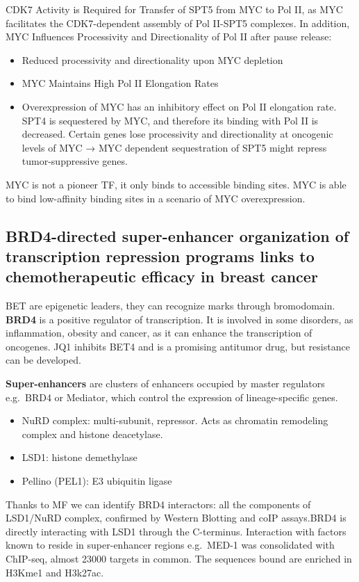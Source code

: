 CDK7 Activity is Required for Transfer of SPT5 from MYC to Pol II, as MYC facilitates the CDK7-dependent assembly of Pol II-SPT5 complexes. In addition, MYC Influences Processivity and Directionality of Pol II after pause release:

\begin{itemize}
\tightlist
\item
  Reduced processivity and directionality upon MYC depletion
\item
  MYC Maintains High Pol II Elongation Rates
\item
  Overexpression of MYC has an inhibitory effect on Pol II elongation
  rate. SPT4 is sequestered by MYC, and therefore its binding with Pol
  II is decreased. Certain genes lose processivity and directionality at
  oncogenic levels of MYC → MYC dependent sequestration of SPT5 might
  repress tumor-suppressive genes.
\end{itemize}

MYC is not a pioneer TF, it only binds to accessible binding sites. MYC is able to bind low-affinity binding sites in a scenario of MYC overexpression.


\subsection{BRD4-directed super-enhancer organization of transcription repression programs links to chemotherapeutic efficacy in breast cancer}

BET are epigenetic leaders, they can recognize marks through
bromodomain. \textbf{BRD4} is a positive regulator of transcription. It
is involved in some disorders, as inflammation, obesity and cancer, as
it can enhance the transcription of oncogenes. JQ1 inhibits BET4 and is
a promising antitumor drug, but resistance can be developed.

\textbf{Super-enhancers} are clusters of enhancers occupied by master
regulators e.g.~BRD4 or Mediator, which control the expression of
lineage-specific genes.
\begin{itemize}
\tightlist
\item
  NuRD complex: multi-subunit, repressor. Acts as chromatin remodeling
  complex and histone deacetylase.
\item
  LSD1: histone demethylase
\item
  Pellino (PEL1): E3 ubiquitin ligase
\end{itemize}

Thanks to MF we can identify BRD4 interactors: all the components of LSD1/NuRD complex, confirmed
by Western Blotting and coIP assays.BRD4 is directly interacting with LSD1 through the C-terminus. Interaction with factors known to reside in super-enhancer regions e.g.~MED-1 was consolidated with ChIP-seq, almost 23000 targets in common. The sequences bound are enriched in H3Kme1 and H3k27ac.

